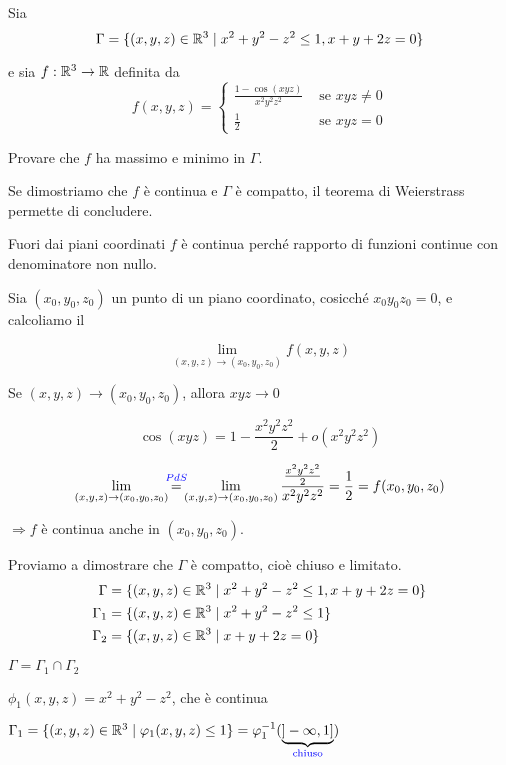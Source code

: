 \begin{exbar}
\begin{example}
	Sia 
	\begin{equation*}
		\Gamma=\{(x,y,z)\in\mathbb{R}^3\mid x^2+y^2-z^2\leq 1, x+y+2z=0\} 
	\end{equation*}
	
	e sia $f:\mathbb{R}^3\rightarrow \mathbb{R} $ definita da 
	\begin{equation*}
		f(x,y,z)=
		\begin{cases}
			\frac{1-\cos(xyz)}{x^2y^2z^2}&\text{ se }xyz\neq 0\\
			\frac{1}{2}&\text{ se }xyz= 0
		\end{cases}
	\end{equation*}
	
	Provare che $f$ ha massimo e minimo in $\Gamma$.
	
	Se dimostriamo che $f$ è continua e $\Gamma$ è compatto, il teorema di Weierstrass permette di concludere.
	
	Fuori dai piani coordinati $f$ è continua perché rapporto di funzioni continue con denominatore non nullo.
	
	Sia $(x_0,y_0,z_0)$ un punto di un piano coordinato, cosicché $x_0y_0z_0=0$, e calcoliamo il
	
	$$\lim_{(x,y,z)\rightarrow(x_0,y_0,z_0)}f(x,y,z)$$
	
	Se $(x,y,z)\rightarrow(x_0,y_0,z_0)$, allora $xyz\rightarrow0$
	
	$$\cos(xyz)=1-\frac{x^2y^2z^2}{2}+o(x^2y^2z^2)$$
	
	$$\lim_{(x,y,z)\rightarrow(x_0,y_0,z_0)} \PdS \lim_{(x,y,z)\rightarrow(x_0,y_0,z_0)} \frac{\frac{x^2y^2z^2}{2}}{x^2y^2z^2}=\frac{1}{2}=f(x_0,y_0,z_0)$$
	
	$\Rightarrow f$ è continua anche in $(x_0,y_0,z_0)$.
	
	Proviamo a dimostrare che $\Gamma$ è compatto, cioè chiuso e limitato.
	\begin{align*} 
		\Gamma &=\{(x,y,z)\in\mathbb{R}^3\mid x^2+y^2-z^2\leq 1, x+y+2z=0\}
		\\
		\Gamma_1 &=\{(x,y,z)\in\mathbb{R}^3\mid x^2+y^2-z^2\leq 1\}
		\\
		\Gamma_2 &=\{(x,y,z)\in\mathbb{R}^3\mid x+y+2z=0\}
	\end{align*}
	\begin{center} 
		$\Gamma=\Gamma_1\cap\Gamma_2$
	
		$\phi_1(x,y,z)=x^2+y^2-z^2$, che è continua 
		
		$\Gamma_1=\{(x,y,z)\in\mathbb{R}^3\mid \varphi_1(x,y,z)\leq 1\} =\varphi_1^{-1}( \underbrace{]-\infty,1]}_{\color{blue} \text{chiuso}})$
	\end{center}
	

\end{example}
\end{exbar}
